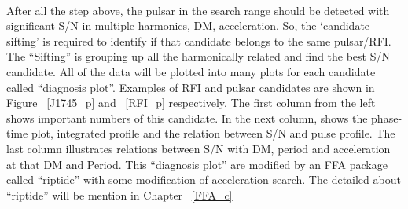 \documentclass[thesis_msc.tex]{subfiles}
\begin{document}
    \paragraph{} After all the step above, the pulsar in the search range should be detected with significant S/N in multiple harmonics, DM, acceleration. So, the `candidate sifting' is required to identify if that candidate belongs to the same pulsar/RFI. The ``Sifting'' is grouping up all the harmonically related and find the best S/N candidate. All of the data will be plotted into many plots for each candidate called ``diagnosis plot''. Examples of RFI and pulsar candidates are shown in Figure ~\ref{J1745_p} and ~\ref{RFI_p} respectively. The first column from the left shows important numbers of this candidate. In the next column, shows the phase-time plot, integrated profile and the relation between S/N and pulse profile. The last column illustrates relations between S/N with DM, period and acceleration at that DM and Period. This ``diagnosis plot'' are modified by an FFA package called ``riptide'' with some modification of acceleration search. The detailed about ``riptide'' will be mention in Chapter ~\ref{FFA_c}
    \begin{figure}[h] \centering
\end{figure}
	
\end{document}
